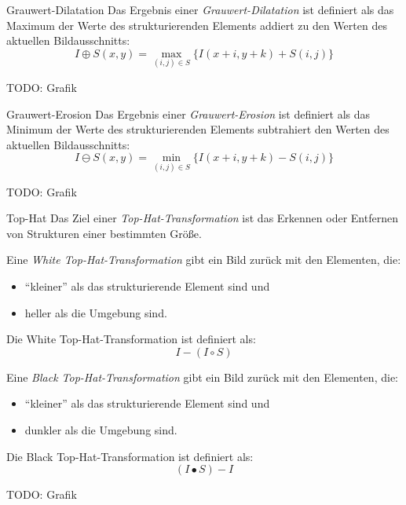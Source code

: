 \begin{defi}{Grauwert-Dilatation}
    Das Ergebnis einer \emph{Grauwert-Dilatation} ist definiert als das Maximum der Werte des strukturierenden Elements addiert zu den Werten des aktuellen Bildausschnitts:
    \[
        I \oplus S(x, y) = \max_{(i, j) \in S} \{ I(x + i, y + k) + S(i, j) \}
    \]

    TODO: Grafik
\end{defi}

\begin{defi}{Grauwert-Erosion}
    Das Ergebnis einer \emph{Grauwert-Erosion} ist definiert als das Minimum der Werte des strukturierenden Elements subtrahiert den Werten des aktuellen Bildausschnitts:
    \[
        I \ominus S(x, y) = \min_{(i, j) \in S} \{ I(x + i, y + k) - S(i, j) \}
    \]

    TODO: Grafik
\end{defi}

\begin{defi}{Top-Hat}
    Das Ziel einer \emph{Top-Hat-Transformation} ist das Erkennen oder Entfernen von Strukturen einer bestimmten Größe.

    Eine \emph{White Top-Hat-Transformation} gibt ein Bild zurück mit den Elementen, die:
    \begin{itemize}
        \item \enquote{kleiner} als das strukturierende Element sind und
        \item heller als die Umgebung sind.
    \end{itemize}

    Die White Top-Hat-Transformation ist definiert als:
    \[
        I - (I \circ S)
    \]

    Eine \emph{Black Top-Hat-Transformation} gibt ein Bild zurück mit den Elementen, die:
    \begin{itemize}
        \item \enquote{kleiner} als das strukturierende Element sind und
        \item dunkler als die Umgebung sind.
    \end{itemize}

    Die Black Top-Hat-Transformation ist definiert als:
    \[
        (I \bullet S) - I
    \]

    TODO: Grafik
\end{defi}